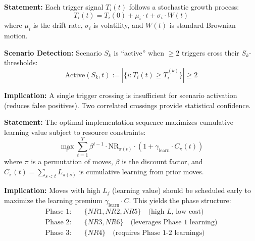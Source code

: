 \begin{tcolorbox}[colback=gray!5!white, colframe=gray!75!black,
    title=Axiom AIM-18: Early Warning Signal Model]
\label{ax:aim-18}

\textbf{Statement:}
Each trigger signal $T_i(t)$ follows a stochastic growth process:
\begin{equation}
T_i(t) = T_i(0) + \mu_i \cdot t + \sigma_i \cdot W(t)
\label{eq:aim-trigger-process}
\end{equation}
where $\mu_i$ is the drift rate, $\sigma_i$ is volatility, and $W(t)$ is
standard Brownian motion.

\textbf{Scenario Detection:}
Scenario $S_k$ is ``active'' when $\geq 2$ triggers cross their $S_k$-thresholds:
\begin{equation}
\text{Active}(S_k, t) := \left|\{i : T_i(t) \geq \bar{T}_i^{(k)}\}\right| \geq 2
\label{eq:aim-scenario-detection}
\end{equation}

\textbf{Implication:} A single trigger crossing is insufficient for scenario
activation (reduces false positives). Two correlated crossings provide
statistical confidence.
\end{tcolorbox}


\begin{tcolorbox}[colback=gray!5!white, colframe=gray!75!black,
    title=Axiom AIM-19: Implementation Sequencing Optimality]
\label{ax:aim-19}

\textbf{Statement:}
The optimal implementation sequence maximizes cumulative learning value
subject to resource constraints:
\begin{equation}
\max_{\pi} \sum_{t=1}^{T} \beta^{t-1} \cdot \text{NR}_{\pi(t)} \cdot (1 + \gamma_{\text{learn}} \cdot C_{\pi}(t))
\label{eq:aim-sequencing}
\end{equation}
where $\pi$ is a permutation of moves, $\beta$ is the discount factor,
and $C_{\pi}(t) = \sum_{s<t} L_{\pi(s)}$ is cumulative learning from
prior moves.

\textbf{Implication:} Moves with high $L_j$ (learning value) should be
scheduled early to maximize the learning premium $\gamma_{\text{learn}} \cdot C$.
This yields the phase structure:
\begin{align}
\text{Phase 1:} & \quad \{NR1, NR2, NR5\} \quad \text{(high $L$, low cost)} \label{eq:aim-phase1} \\
\text{Phase 2:} & \quad \{NR3, NR6\} \quad \text{(leverages Phase 1 learning)} \label{eq:aim-phase2} \\
\text{Phase 3:} & \quad \{NR4\} \quad \text{(requires Phase 1-2 learnings)} \label{eq:aim-phase3}
\end{align}
\end{tcolorbox}


